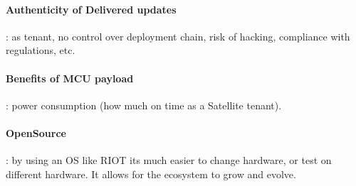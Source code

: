 \paragraph*{Authenticity of Delivered updates}: as tenant, no control over deployment
chain, risk of hacking, compliance with regulations, etc.
\paragraph*{Benefits of MCU payload}: power consumption (how much on time as a Satellite tenant).
\paragraph*{OpenSource}: by using an OS like RIOT its much easier to change hardware,
or test on different hardware. It allows for the ecosystem to grow and evolve.

\iffalse

\subsection{Open Source} \cite{shalashov2021OpenSourceCubeSatReview}, \cite{Holliday2019PyCubed}
\paragraph*{Why Open-Source Satellite Initiatives}
\paragraph*{pyCube, etc.}
\paragraph*{RIOT}: project overview, architecture overview\cite{baccelli2018riot}


\subsection{LoRa}
\label{sec:lora-cubesat}
\paragraph*{CubeSat LoRa missions} \cite{saeed2020CubeSatReview}
\paragraph*{Research topics, challenges of LoRa in space} \cite{saeed2020CubeSatReview}

\fi

